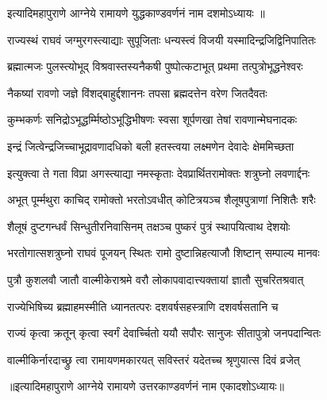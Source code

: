 इत्यादिमहापुराणे आग्नेये रामायणे युद्धकाण्डवर्णनं नाम दशमोऽध्यायः ॥



\twolineshloka
{राज्यस्थं राघवं जग्मुरगस्त्याद्याः सुपूजिताः}
{धन्यस्त्वं विजयी यस्मादिन्द्रजिद्विनिपातितः}%

\twolineshloka
{ब्रह्मात्मजः पुलस्त्योभूद् विश्रवास्तस्यनैकषी}
{पुष्पोत्कटाभूत् प्रथमा तत्पुत्रोभूद्धनेश्वरः}%

\twolineshloka
{नैकष्यां रावणो जज्ञे विंशद्बाहुर्द्दशाननः}
{तपसा ब्रह्मदत्तेन वरेण जितदैवतः}%

\twolineshloka
{कुम्भकर्णः सनिद्रोऽभूद्धर्म्मिष्ठोऽभूद्धिभीषणः}
{स्वसा शूर्पणखा तेषां रावणान्मेघनादकः}%

\twolineshloka
{इन्द्रं जित्वेन्द्रजिच्चाभूद्रावणादधिको बली}
{हतस्त्वया लक्ष्मणेन देवादेः क्षेममिच्छता}%

\twolineshloka
{इत्युक्त्वा ते गता विप्रा अगस्त्याद्या नमस्कृताः}
{देवप्रार्थितरामोक्तः शत्रुघ्नो लवणार्द्दनः}%

\twolineshloka
{अभूत् पूर्म्मथुरा काचिद् रामोक्तो भरतोऽवधीत्}
{कोटित्रयञ्च शैलूषपुत्राणां निशितैः शरैः}%

\twolineshloka
{शैलूषं दुप्टगन्धर्वं सिन्धुतीरनिवासिनम्}
{तक्षञ्च पुष्करं पुत्रं स्थापयित्वाथ देशयोः}%

\twolineshloka
{भरतोगात्सशत्रुघ्नो राघवं पूजयन् स्थितः}
{रामो दुष्टान्निहत्याजौ शिष्टान् सम्पाल्य मानवः}%

\twolineshloka
{पुत्रौ कुशलवौ जातौ वाल्मीकेराश्रमे वरौ}
{लोकापवादात्त्यक्तायां ज्ञातौ सुचरितश्रवात्}%

\twolineshloka
{राज्येभिषिच्य ब्रह्माहमस्मीति ध्यानतत्परः}
{दशवर्षसहस्त्राणि दशवर्षसतानि च}%

\twolineshloka
{राज्यं कृत्वा क्रतून् कृत्वा स्वर्गं देवार्च्चितो ययौ}
{सपौरः सानुजः सीतापुत्रो जनपदान्वितः}%
                     
\twolineshloka
{वाल्मीकिर्नारदाच्छ्रु त्वा रामायणमकारयत्}
{सविस्तरं यदेतच्च श्रृणुयात्स दिवं व्रजेत्}%

॥इत्यादिमहापुराणे आग्नेये रामायणे उत्तरकाण्डवर्णनं नाम एकादशोऽध्यायः॥

\closesection
